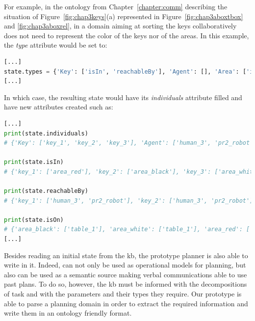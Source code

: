 \documentclass[a4paper,11pt,twoside]{StyleThese}
\begin{document}
For example, in the ontology from Chapter~\ref{chapter:comm} describing the situation of Figure~\ref{fig:chap3keys}(a) represented in Figure~\ref{fig:chap3aboxtbox} and \ref{fig:chap3aboxrel}, in a domain aiming at sorting the keys collaboratively does not need to represent the color of the keys nor of the areas. In this example, the \textit{type} attribute would be set to: 


\begin{lstlisting}[language=Python]
[...]
state.types = {'Key': ['isIn', 'reachableBy'], 'Agent': [], 'Area': ['isOn']}
[...]
\end{lstlisting}
In which case, the resulting state would have its \textit{individuals} attribute filled and have new attributes created such as:


\begin{lstlisting}[language=Python]
[...]
print(state.individuals)
# {'Key': ['key_1', 'key_2', 'key_3'], 'Agent': ['human_3', 'pr2_robot'], 'Area': ['area_black', 'area_white', 'area_red'], 'Table': ['table_1']}

print(state.isIn)
# {'key_1': ['area_red'], 'key_2': ['area_black'], 'key_3': ['area_white']}

print(state.reachableBy)
# {'key_1': ['human_3', 'pr2_robot'], 'key_2': ['human_3', 'pr2_robot'], 'key_3': ['human_3', 'pr2_robot']}

print(state.isOn)
# {'area_black': ['table_1'], 'area_white': ['table_1'], 'area_red': ['table_1']}
[...]
\end{lstlisting}


Besides reading an initial state from the \acrshort{kb}, the prototype planner is also able to write in it. Indeed,  can not only be used as operational models for planning, but also can be used as a semantic source making verbal communications able to use past plans. To do so, however, the \acrshort{kb} must be informed with the decompositions of task and with the parameters and their types they require. Our prototype is able to parse a planning domain in order to extract the required information and write them in an ontology friendly format.
\end{document}
